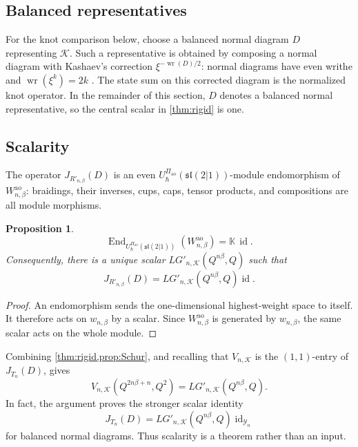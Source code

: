 \documentclass[11pt,a4paper]{article}
\newcommand{\hK}{\mathbb K}
\newcommand{\id}{\operatorname{id}}
\newcommand{\Writhe}{\operatorname{wr}}
\newcommand{\End}{\operatorname{End}}
\newcommand{\ao}{\mathrm{ao}}
\newtheorem{proposition}[theorem]{Proposition}
\theoremstyle{definition}
\theoremstyle{remark}
\begin{document}
\subsection{Balanced representatives}

For the knot comparison below, choose a balanced normal diagram \(D\)
representing \(\mathcal K\).  Such a representative is obtained by
composing a normal diagram with Kashaev's correction
\(\xi^{-\Writhe(D)/2}\): normal diagrams have even writhe and
\(\Writhe(\xi^k)=2k\)
\cite[Section~1, Remark~3, and Section~2, Theorem~1]{KashaevLong}.
The state sum on this corrected diagram is the normalized knot operator.
In the remainder of this section, \(D\) denotes a balanced normal
representative, so the central scalar in \cref{thm:rigid} is one.

\subsection{Scalarity}

The operator \(J_{R'_{n,\beta}}(D)\) is an even
\(U_\hbar^{\Pi_{\ao}}(\mathfrak{sl}(2|1))\)-module endomorphism of
\(W_{n,\beta}^{\ao}\): braidings, their inverses, cups, caps, tensor
products, and compositions are all module morphisms.

\begin{proposition}\label{prop:Schur}
\[
 \End_{U_\hbar^{\Pi_{\ao}}(\mathfrak{sl}(2|1))}
 (W_{n,\beta}^{\ao})
 =\hK\,\id.
\]
Consequently, there is a unique scalar
\(LG'_{n,\mathcal K}(Q^{n\beta},Q)\) such that
\[
 J_{R'_{n,\beta}}(D)
 =LG'_{n,\mathcal K}(Q^{n\beta},Q)\id.
\]
\end{proposition}

\begin{proof}
An endomorphism sends the one-dimensional highest-weight space to itself.
It therefore acts on \(w_{n,\beta}\) by a scalar.  Since
\(W_{n,\beta}^{\ao}\) is generated by \(w_{n,\beta}\), the same scalar
acts on the whole module.
\end{proof}

Combining \cref{thm:rigid,prop:Schur}, and recalling that
\(V_{n,\mathcal K}\) is the \((1,1)\)-entry of \(J_{T_n}(D)\), gives
\begin{equation}\label{eq:V-LGprime}
 V_{n,\mathcal K}(Q^{2n\beta+n},Q^2)
 =LG'_{n,\mathcal K}(Q^{n\beta},Q).
\end{equation}
In fact, the argument proves the stronger scalar identity
\[
 J_{T_n}(D)
 =LG'_{n,\mathcal K}(Q^{n\beta},Q)\id_{\mathcal Y_n}
\]
for balanced normal diagrams.  Thus scalarity is a theorem rather than
an input.
\end{document}
